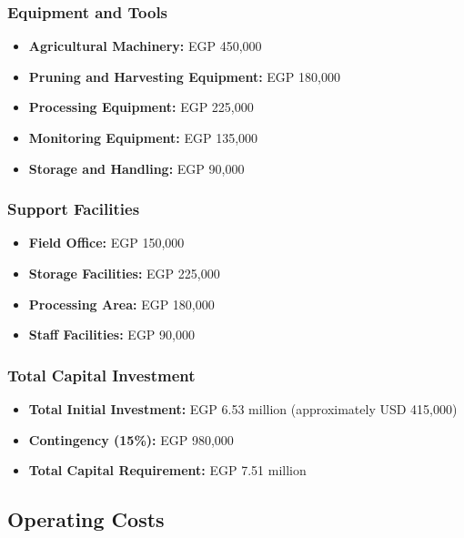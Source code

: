 \subsubsection{Equipment and Tools}
\begin{itemize}
    \item \textbf{Agricultural Machinery:} EGP 450,000
    \item \textbf{Pruning and Harvesting Equipment:} EGP 180,000
    \item \textbf{Processing Equipment:} EGP 225,000
    \item \textbf{Monitoring Equipment:} EGP 135,000
    \item \textbf{Storage and Handling:} EGP 90,000
\end{itemize}

\subsubsection{Support Facilities}
\begin{itemize}
    \item \textbf{Field Office:} EGP 150,000
    \item \textbf{Storage Facilities:} EGP 225,000
    \item \textbf{Processing Area:} EGP 180,000
    \item \textbf{Staff Facilities:} EGP 90,000
\end{itemize}

\subsubsection{Total Capital Investment}
\begin{itemize}
    \item \textbf{Total Initial Investment:} EGP 6.53 million (approximately USD 415,000)
    \item \textbf{Contingency (15\%):} EGP 980,000
    \item \textbf{Total Capital Requirement:} EGP 7.51 million
\end{itemize}

\subsection{Operating Costs}

